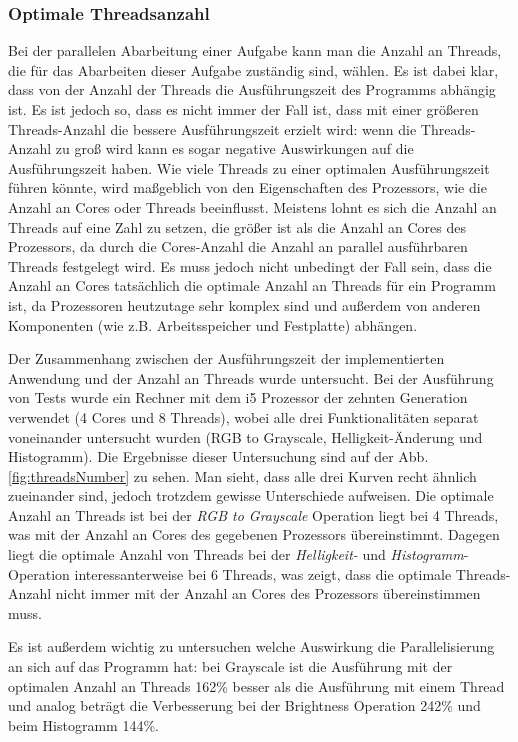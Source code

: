 \documentclass[11pt]{amsart}
\begin{document}
\subsubsection{Optimale Threadsanzahl}
Bei der parallelen Abarbeitung einer Aufgabe kann man die Anzahl an Threads, die für das Abarbeiten dieser Aufgabe zuständig sind, wählen. Es ist dabei klar, dass von der Anzahl der Threads die Ausführungszeit des Programms abhängig ist. Es ist jedoch so, dass es nicht immer der Fall ist, dass mit einer größeren Threads-Anzahl die bessere Ausführungszeit erzielt wird: wenn die Threads-Anzahl zu groß wird kann es sogar negative Auswirkungen auf die Ausführungszeit haben. Wie viele Threads zu einer optimalen Ausführungszeit führen könnte, wird maßgeblich von den Eigenschaften des Prozessors, wie die Anzahl an Cores oder Threads beeinflusst. Meistens lohnt es sich die Anzahl an Threads auf eine Zahl zu setzen, die größer ist als  die Anzahl an Cores des Prozessors, da durch die Cores-Anzahl die Anzahl an parallel ausführbaren Threads festgelegt wird. Es muss jedoch nicht unbedingt der Fall sein, dass die Anzahl an Cores tatsächlich die optimale Anzahl an Threads für ein Programm ist, da Prozessoren heutzutage sehr komplex sind und außerdem von anderen Komponenten (wie z.B. Arbeitsspeicher und Festplatte) abhängen.

Der Zusammenhang zwischen der Ausführungszeit der implementierten Anwendung und der Anzahl an Threads wurde untersucht. Bei der Ausführung von Tests wurde ein Rechner mit dem i5 Prozessor der zehnten Generation verwendet (4 Cores und 8 Threads), wobei alle drei Funktionalitäten separat voneinander untersucht wurden (RGB to Grayscale, Helligkeit-Änderung und Histogramm). Die Ergebnisse dieser Untersuchung sind auf der Abb. \ref{fig:threadsNumber} zu sehen. Man sieht, dass alle drei Kurven recht ähnlich zueinander sind, jedoch trotzdem gewisse Unterschiede aufweisen. Die optimale Anzahl an Threads ist bei der \textit{RGB to Grayscale} Operation liegt bei 4 Threads, was mit der Anzahl an Cores des gegebenen Prozessors übereinstimmt. Dagegen liegt die optimale Anzahl von Threads bei der \textit{Helligkeit-} und \textit{Histogramm}-Operation interessanterweise bei 6 Threads, was zeigt, dass die optimale Threads-Anzahl nicht immer mit der Anzahl an Cores des Prozessors übereinstimmen muss.

Es ist außerdem wichtig zu untersuchen welche Auswirkung die Parallelisierung an sich auf das Programm hat: bei Grayscale ist die Ausführung mit der optimalen Anzahl an Threads 162\% besser als die Ausführung mit einem Thread und analog beträgt die Verbesserung bei der Brightness Operation 242\% und beim Histogramm 144\%.
\end{document}
